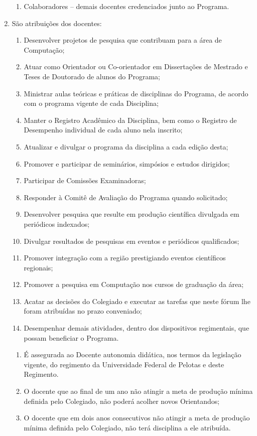 \documentclass{article}
\begin{document}
\begin{enumerate}
\begin{enumerate}[label=\Roman*]
		\item Colaboradores – demais docentes credenciados junto ao Programa.

	\end{enumerate}

	\item São atribuições dos docentes:
	\begin{enumerate}[label=\Roman*]
		\item 	Desenvolver projetos de pesquisa que contribuam para a área de Computação;
		\item	Atuar como Orientador ou Co-orientador em Dissertações de Mestrado e Teses de Doutorado de alunos do Programa;
		\item	Ministrar aulas teóricas e práticas de disciplinas do Programa, de acordo com o programa vigente de cada Disciplina;
		\item	Manter o Registro Acadêmico da Disciplina, bem como o Registro de Desempenho individual de cada aluno nela inscrito;
		\item	Atualizar e divulgar o programa da disciplina a cada edição desta;
		\item	Promover e participar de seminários, simpósios e estudos dirigidos;
		\item	Participar de Comissões Examinadoras;
		\item	Responder à Comitê de Avaliação do Programa quando solicitado;
		\item	Desenvolver pesquisa que resulte em produção científica divulgada em periódicos indexados;
		\item	Divulgar resultados de pesquisas em eventos e periódicos qualificados;
		\item	Promover integração com a região prestigiando eventos científicos regionais;
		\item	Promover a pesquisa em Computação nos cursos de graduação da área;
		\item	Acatar as decisões do Colegiado e executar as tarefas que neste fórum lhe foram atribuídas no prazo conveniado;
		\item	Desempenhar demais atividades, dentro dos dispositivos regimentais, que possam beneficiar o Programa.
	\end{enumerate}

	\begin{enumerate}
		\item É assegurada ao Docente autonomia didática, nos termos da legislação vigente, do regimento da Universidade Federal de Pelotas e deste Regimento.

		\item O docente que ao final de um ano não atingir a meta de produção mínima definida pelo Colegiado, não poderá acolher novos Orientandos;

		\item O docente que em dois anos consecutivos não atingir a meta de produção mínima definida pelo Colegiado, não terá disciplina a ele atribuída.
	\end{enumerate}
\end{enumerate}
\end{document}
